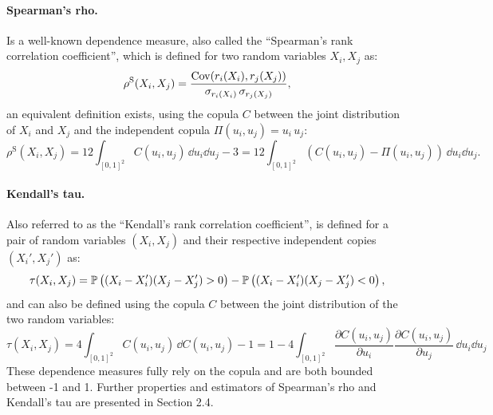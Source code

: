 \paragraph{Spearman's rho.} 
Is a well-known dependence measure, also called the ``Spearman's rank correlation coefficient'', which is defined for two random variables $X_i, X_j$ as: 
\begin{equation}
    \rho^{\mathrm{S}}(X_i, X_j) = \frac{\cov(r_i(X_i), r_j(X_j))}{\sigma_{r_i(X_i)} \, \sigma_{r_j(X_j)}},
\end{equation}
an equivalent definition exists, using the copula $C$ between the joint distribution of $X_i$ and $X_j$ and the independent copula $\Pi(u_i, u_j) = u_i \, u_j$: 
\begin{equation}
    \rho^{\mathrm{S}}(X_i, X_j) = 12 \int_{[0, 1]^2} C(u_i, u_j) \, \dd u_i \dd u_j - 3 = 12 \int_{[0, 1]^2} (C(u_i, u_j) - \Pi(u_i, u_j)) \, \dd u_i \dd u_j. 
\end{equation}

\paragraph{Kendall's tau.} 
Also referred to as the ``Kendall's rank correlation coefficient'', is defined for a pair of random variables $(X_i, X_j)$ and their respective independent copies $(X_i', X_j')$ as: 
\begin{equation}
    \tau(X_i, X_j) = \P\left((X_i - X_i')(X_j - X_j') > 0 \right) - \P\left((X_i - X_i')(X_j - X_j') < 0 \right),
\end{equation}
and can also be defined using the copula $C$ between the joint distribution of the two random variables: 
\begin{equation}
    \tau(X_i, X_j) = 4 \int_{[0, 1]^2} C(u_i, u_j) \, \dd C(u_i, u_j) - 1 = 1 - 4 \int_{[0, 1]^2} \frac{\partial C(u_i, u_j)}{\partial u_i} \frac{\partial C(u_i, u_j)}{\partial u_j} \, \dd u_i \dd u_j 
\end{equation}
These dependence measures fully rely on the copula and are both bounded between -1 and 1. 
Further properties and estimators of Spearman's rho and Kendall's tau are presented in \citet{durante_2015_copula} Section 2.4. 

